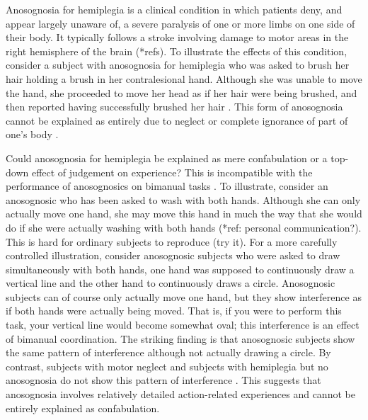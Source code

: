 \documentclass[12pt,\papersize]{extarticle}
\begin{document}
Anosognosia for hemiplegia is a clinical condition in which patients deny, and appear largely unaware of, a severe paralysis of one or more limbs on one side of their body.  It typically follows a stroke involving damage to motor areas in the right hemisphere of the brain (*refs).  To illustrate the effects of this condition, consider a subject with anosognosia for hemiplegia who was asked to brush her hair holding a brush in her contralesional hand.  Although she was unable to move the hand, she proceeded to move her head as if her hair were being brushed, and then reported having successfully brushed her hair \citep{berti:2008_motor}. This form of anosognosia cannot be explained as entirely due to neglect or complete ignorance of part of one's body \citep[p.\ 165]{berti:2008_motor}.  

Could anosognosia for hemiplegia be explained as mere  confabulation or a top-down effect of judgement on experience?  This is incompatible with the performance of anosognosics on bimanual tasks \citep{berti:2008_motor, garbarini:2012_moving}.  To illustrate, consider an anosognosic who has been asked to wash with both hands.  Although she can only actually move one hand, she may move this hand in much the way that she would do if she were actually washing with both hands (*ref: personal communication?).  This is hard for ordinary subjects to reproduce (try it). For a more carefully controlled illustration, consider anosognosic subjects who were asked to draw simultaneously with both hands, one hand was supposed to continuously draw a vertical line and the other hand to continuously draws a circle.  Anosognosic subjects can of course only actually move one hand, but they show interference as if both hands were actually being moved.  That is, if you were to perform this task, your vertical line would become somewhat oval; this interference is an effect of bimanual coordination.  The striking finding is that anosognosic subjects show the same pattern of interference although not actually drawing a circle.  By contrast, subjects with motor neglect and subjects with hemiplegia but no anosognosia do not show this pattern of interference \citep{garbarini:2012_moving}.  This suggests that anosognosia involves relatively detailed action-related experiences and cannot be entirely explained as confabulation.  
\end{document}
